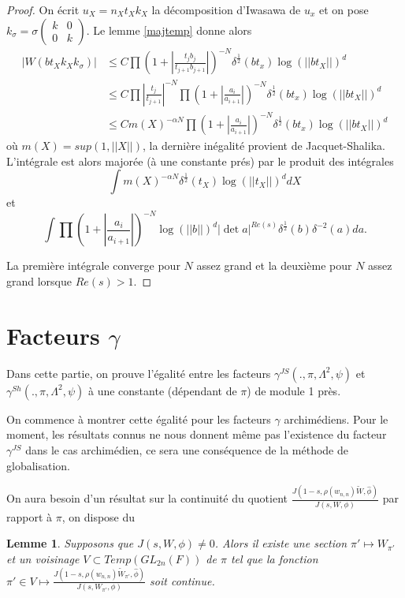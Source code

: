 \documentclass{amsart}
\newtheorem{lemme}{Lemme}[section]
\begin{document}
\begin{proof}
 On écrit $u_X = n_Xt_Xk_X$ la décomposition d'Iwasawa de $u_x$ et on pose $k_\sigma = \sigma \begin{pmatrix}
k & 0 \\
0 & k
\end{pmatrix}$. Le lemme \ref{majtemp} donne alors
 \begin{align}
 |W(bt_Xk_Xk_\sigma)| &\leq C \prod (1+  |\frac{t_jb_j}{t_{j+1}b_{j+1}}|)^{-N} \delta^{\frac{1}{2}}(bt_x)\log(||bt_X||)^d \\
 &\leq C \prod |\frac{t_j}{t_{j+1}}|^{-N} \prod (1 + |\frac{a_i}{a_{i+1}}|)^{-N} \delta^{\frac{1}{2}}(bt_x)\log(||bt_X||)^d \\
 &\leq C m(X)^{-\alpha N} \prod (1 + |\frac{a_i}{a_{i+1}}|)^{-N} \delta^{\frac{1}{2}}(bt_x)\log(||bt_X||)^d
 \end{align}
 où $m(X) = sup(1, ||X||)$, la dernière inégalité provient de Jacquet-Shalika. L'intégrale est alors majorée (à une constante prés) par le produit des intégrales
 \begin{equation}
 \int m(X)^{-\alpha N} \delta^{\frac{1}{2}}(t_X)\log(||t_X||)^d dX
 \end{equation}
 et
 \begin{equation}
 \int \prod (1+ |\frac{a_i}{a_{i+1}}|)^{-N} \log(||b||)^d|\det a|^{Re(s)} \delta^{\frac{1}{2}}(b)\delta^{-2}(a) da.
 \end{equation}
 
 La première intégrale converge pour $N$ assez grand et la deuxième pour $N$ assez grand lorsque $Re(s) > 1$.
  \end{proof}
  
 \section{Facteurs $\gamma$}
 
 Dans cette partie, on prouve l'égalité entre les facteurs $\gamma^{JS}(., \pi, \Lambda^2, \psi)$ et $\gamma^{Sh}(., \pi, \Lambda^2, \psi)$ à une constante (dépendant de $\pi$) de module 1 près.
 
 On commence à montrer cette égalité pour les facteurs $\gamma$ archimédiens. Pour le moment, les résultats connus ne nous donnent même pas l'existence du facteur $\gamma^{JS}$ dans le cas archimédien, ce sera une conséquence de la méthode de globalisation.
 
 On aura besoin d'un résultat sur la continuité du quotient $\frac{J(1-s, \rho(w_{n,n})\tilde{W}, \hat{\phi})}{J(s, W, \phi)}$ par rapport à $\pi$, on dispose du
 \begin{lemme}
 \label{cont}
 Supposons que $J(s, W, \phi) \neq 0$. Alors il existe une section $\pi' \mapsto W_{\pi'}$ et un voisinage $V \subset Temp(GL_{2n}(F))$ de $\pi$ tel que la fonction $\pi' \in V \mapsto \frac{J(1-s, \rho(w_{n,n})\tilde{W}_{\pi'}, \hat{\phi})}{J(s, W_{\pi'}, \phi)}$ soit continue.
 \end{lemme}
 
\end{document}
